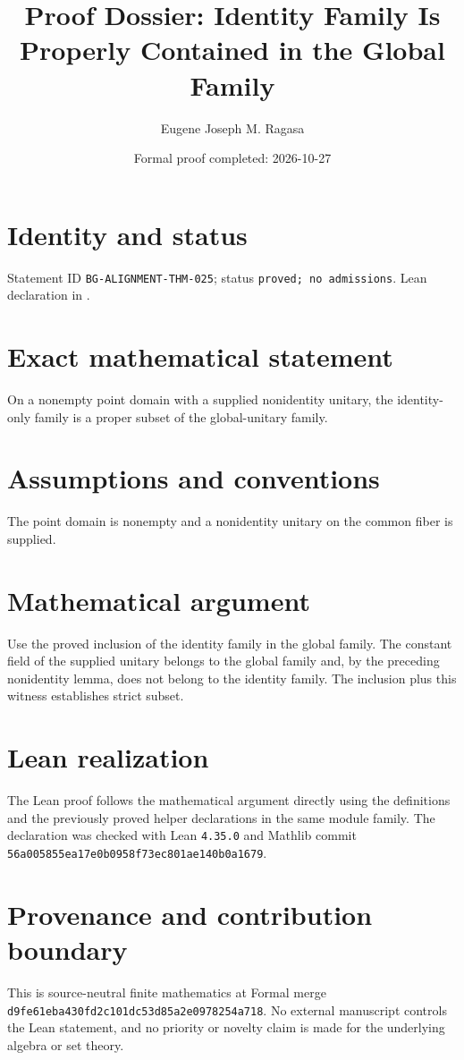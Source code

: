 \documentclass[11pt]{article}
\title{Proof Dossier: Identity Family Is Properly Contained in the Global Family}
\author{Eugene Joseph M. Ragasa}
\date{Formal proof completed: 2026-10-27}
\begin{document}
\raggedright
\maketitle

\section{Identity and status}
Statement ID \texttt{BG-ALIGNMENT-THM-025}; status \texttt{proved; no admissions}.  Lean declaration
 in
.

\section{Exact mathematical statement}
On a nonempty point domain with a supplied nonidentity unitary, the identity-only family is a proper subset of the global-unitary family.

\section{Assumptions and conventions}
The point domain is nonempty and a nonidentity unitary on the common fiber is supplied.

\section{Mathematical argument}
Use the proved inclusion of the identity family in the global family.  The constant field of the supplied unitary belongs to the global family and, by the preceding nonidentity lemma, does not belong to the identity family.  The inclusion plus this witness establishes strict subset.

\section{Lean realization}
The Lean proof follows the mathematical argument directly using the definitions and the
previously proved helper declarations in the same module family.  The declaration was checked
with Lean \texttt{4.35.0} and Mathlib commit \texttt{56a005855ea17e0b0958f73ec801ae140b0a1679}.

\section{Provenance and contribution boundary}
This is source-neutral finite mathematics at Formal merge
\texttt{d9fe61eba430fd2c101dc53d85a2e0978254a718}.  No external manuscript controls the Lean statement, and no priority or
novelty claim is made for the underlying algebra or set theory.
\end{document}
